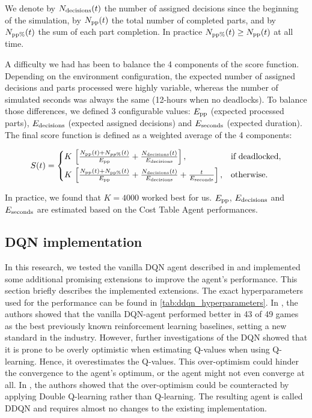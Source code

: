 \documentclass[sn-mathphys]{sn-jnl}
\begin{document}
We denote by $N_{\rm decisions}(t)$ the number of assigned decisions since the beginning of the simulation, by $N_{\rm pp}(t)$ the total number of completed parts, and by $N_{\rm pp\%}(t)$ the sum of each part completion. In practice $N_{\rm pp\%}(t) \ge N_{\rm pp}(t)$ at all time.

A difficulty we had has been to balance the 4 components of the score function. Depending on the environment configuration, the expected number of assigned decisions and parts processed were highly variable, whereas the number of simulated seconds was always the same (12-hours when no deadlocks). To balance those differences, we defined 3 configurable values: $E_{\rm pp}$ (expected processed parts), $E_{\rm decisions}$ (expected assigned decisions) and $E_{\rm seconds}$ (expected duration). The final score function is defined as a weighted average of the 4 components:

\begin{equation}
S(t) =\begin{cases} 
K \, \left[ \frac{N_{\rm pp}(t) + N_{pp\%}(t)}{E_{\rm pp}} + \frac{N_{\rm decisions}(t)}{ E_{\rm decisions}}\right], & \text{if deadlocked},\\[6pt]
K \, \left[\frac{N_{\rm pp}(t) + N_{\rm pp\%}(t)}{E_{\rm pp}} + \frac{N_{\rm decisions}(t)}{E_{\rm decisions}} + \frac{t}{E_{\rm seconds}} \right], & \text{otherwise}.
\end{cases}
\end{equation}


In practice, we found that $K=4000$ worked best for us. $E_{\rm pp}$, $E_{\rm decisions}$ and $E_{\rm seconds}$ are estimated based on the Cost Table Agent performances.

\subsection{DQN implementation}

In this research, we tested the vanilla DQN agent described in \cite{Mnih} and implemented some additional promising extensions to improve the agent's performance. This section briefly describes the implemented extensions. The exact hyperparameters used for the performance can be found in \ref{tab:ddqn_hyperparameters}. In \cite{Mnih}, the authors showed that the vanilla DQN-agent performed better in 43 of 49 games as the best previously known reinforcement learning baselines, setting a new standard in the industry. However, further investigations of the DQN showed that it is prone to be overly optimistic when estimating Q-values when using Q-learning. Hence, it overestimates the Q-values. This over-optimism could hinder the convergence to the agent's optimum, or the agent might not even converge at all. In \cite{HasseltGS15}, the authors showed that the over-optimism could be counteracted by applying Double Q-learning rather than Q-learning. The resulting agent is called DDQN and requires almost no changes to the existing implementation.
\end{document}
